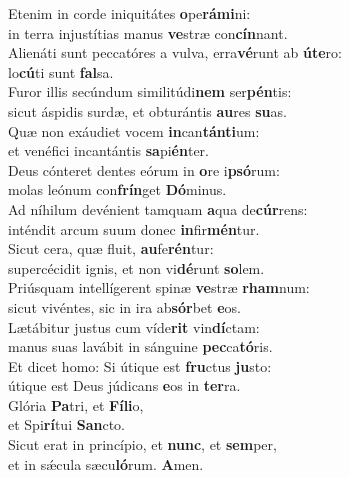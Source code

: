 \evenverse Etenim in corde iniquitátes \textbf{o}pe\textbf{rá}\textbf{mi}ni:~\*\\
\evenverse in terra injustítias manus \textbf{ve}stræ con\textbf{cín}nant.\\
\oddverse Alienáti sunt peccatóres a vulva, erra\textbf{vé}runt ab \textbf{ú}\textbf{te}ro:~\*\\
\oddverse lo\textbf{cú}ti sunt \textbf{fal}sa.\\
\evenverse Furor illis secúndum similitúdi\textbf{nem} ser\textbf{pén}tis:~\*\\
\evenverse sicut áspidis surdæ, et obturántis \textbf{au}res \textbf{su}as.\\
\oddverse Quæ non exáudiet vocem \textbf{in}can\textbf{tán}\textbf{ti}um:~\*\\
\oddverse et venéfici incantántis \textbf{sa}pi\textbf{én}ter.\\
\evenverse Deus cónteret dentes eórum in \textbf{o}re i\textbf{psó}rum:~\*\\
\evenverse molas leónum con\textbf{frín}get \textbf{Dó}minus.\\
\oddverse Ad níhilum devénient tamquam \textbf{a}qua de\textbf{cúr}rens:~\*\\
\oddverse inténdit arcum suum donec \textbf{in}fir\textbf{mén}tur.\\
\evenverse Sicut cera, quæ fluit, \textbf{au}fe\textbf{rén}tur:~\*\\
\evenverse supercécidit ignis, et non vi\textbf{dé}runt \textbf{so}lem.\\
\oddverse Priúsquam intellígerent spinæ \textbf{ve}stræ \textbf{rham}num:~\*\\
\oddverse sicut vivéntes, sic in ira ab\textbf{sór}bet \textbf{e}os.\\
\evenverse Lætábitur justus cum víde\textbf{rit} vin\textbf{dí}ctam:~\*\\
\evenverse manus suas lavábit in sánguine \textbf{pec}ca\textbf{tó}ris.\\
\oddverse Et dicet homo: Si útique est \textbf{fru}ctus \textbf{ju}sto:~\*\\
\oddverse útique est Deus júdicans \textbf{e}os in \textbf{ter}ra.\\
\evenverse Glória \textbf{Pa}tri, et \textbf{Fí}\textbf{li}o,~\*\\
\evenverse et Spi\textbf{rí}tui \textbf{San}cto.\\
\oddverse Sicut erat in princípio, et \textbf{nunc}, et \textbf{sem}per,~\*\\
\oddverse et in sǽcula sæcu\textbf{ló}rum. \textbf{A}men.\\
